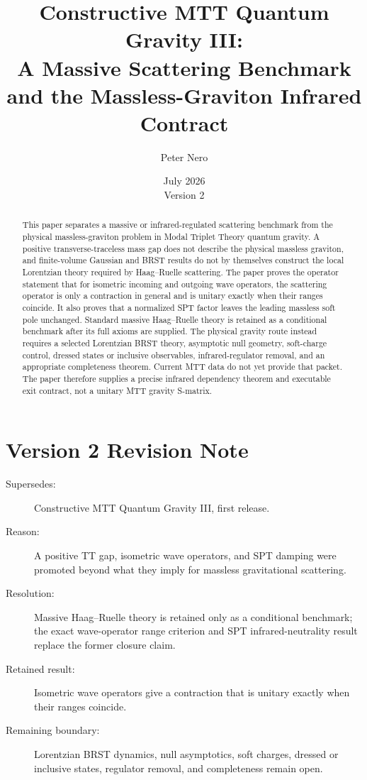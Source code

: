 \documentclass[11pt]{article}
\title{Constructive MTT Quantum Gravity III:\\
\large A Massive Scattering Benchmark and the Massless-Graviton Infrared Contract}
\author{Peter Nero}
\date{July 2026\\Version 2}
\begin{document}
\maketitle

\begin{abstract}
This paper separates a massive or infrared-regulated scattering benchmark
from the physical massless-graviton problem in Modal Triplet Theory quantum
gravity. A positive transverse-traceless mass gap does not describe the
physical massless graviton, and finite-volume Gaussian and BRST results do
not by themselves construct the local Lorentzian theory required by
Haag--Ruelle scattering. The paper proves the operator statement that
for isometric incoming and outgoing wave operators, the scattering operator
is only a contraction in general and is unitary exactly when their ranges
coincide. It also proves that a normalized SPT factor leaves the leading
massless soft pole unchanged. Standard massive Haag--Ruelle theory is retained
as a conditional benchmark after its full axioms are supplied. The physical
gravity route instead requires a selected Lorentzian BRST theory, asymptotic
null geometry, soft-charge control, dressed states or inclusive observables,
infrared-regulator removal, and an appropriate completeness theorem. Current
MTT data do not yet provide that packet. The paper therefore supplies a
precise infrared dependency theorem and executable exit contract, not a
unitary MTT gravity S-matrix.
\end{abstract}

\section*{Version 2 Revision Note}
\begin{description}
\item[Supersedes:] Constructive MTT Quantum Gravity III, first release.
\item[Reason:] A positive TT gap, isometric wave operators, and SPT damping
were promoted beyond what they imply for massless gravitational scattering.
\item[Resolution:] Massive Haag--Ruelle theory is retained only as a
conditional benchmark; the exact wave-operator range criterion and SPT
infrared-neutrality result replace the former closure claim.
\item[Retained result:] Isometric wave operators give a contraction that is
unitary exactly when their ranges coincide.
\item[Remaining boundary:] Lorentzian BRST dynamics, null asymptotics, soft
charges, dressed or inclusive states, regulator removal, and completeness
remain open.
\end{description}
\end{document}
